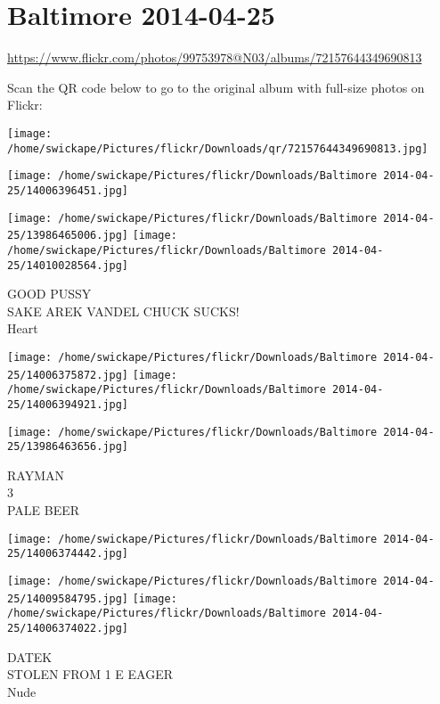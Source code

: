 \documentclass[10pt,letterpaper]{article}
\title{}
\author{}
\date{}
\begin{document}
\section*{Baltimore 2014-04-25}

\url{https://www.flickr.com/photos/99753978@N03/albums/72157644349690813}

Scan the QR code below to go to the original album with full-size photos on Flickr:

\texttt{[image: /home/swickape/Pictures/flickr/Downloads/qr/72157644349690813.jpg]}
\pagebreak

\texttt{[image: /home/swickape/Pictures/flickr/Downloads/Baltimore 2014-04-25/14006396451.jpg]}

\vspace{0.25in}
\texttt{[image: /home/swickape/Pictures/flickr/Downloads/Baltimore 2014-04-25/13986465006.jpg]}
\texttt{[image: /home/swickape/Pictures/flickr/Downloads/Baltimore 2014-04-25/14010028564.jpg]}

GOOD PUSSY\\
SAKE AREK VANDEL CHUCK SUCKS!\\
Heart
\pagebreak

\texttt{[image: /home/swickape/Pictures/flickr/Downloads/Baltimore 2014-04-25/14006375872.jpg]}
\texttt{[image: /home/swickape/Pictures/flickr/Downloads/Baltimore 2014-04-25/14006394921.jpg]}

\vspace{0.25in}
\texttt{[image: /home/swickape/Pictures/flickr/Downloads/Baltimore 2014-04-25/13986463656.jpg]}

RAYMAN\\
3\\
PALE BEER
\pagebreak

\texttt{[image: /home/swickape/Pictures/flickr/Downloads/Baltimore 2014-04-25/14006374442.jpg]}

\vspace{0.25in}
\texttt{[image: /home/swickape/Pictures/flickr/Downloads/Baltimore 2014-04-25/14009584795.jpg]}
\texttt{[image: /home/swickape/Pictures/flickr/Downloads/Baltimore 2014-04-25/14006374022.jpg]}

DATEK\\
STOLEN FROM 1 E EAGER\\
Nude
\pagebreak
\end{document}
